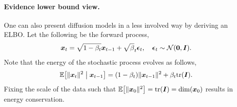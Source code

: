 \paragraph{Evidence lower bound view.}

One can also present diffusion models in a less involved way by deriving an ELBO. Let the following be the forward process, \[
    \bm{x}_t = \sqrt{1-\beta_t} \bm{x}_{t-1} + \sqrt{\beta}_t \bm{\epsilon}_t, \quad \bm{\epsilon}_t \sim \mathcal{N}(\bm{0}, \bm{I}).
\]
Note that the energy of the stochastic process evolves as follows, \[
    \E \lft[ \| \vec{x}_t \|^2 \;\middle|\; \vec{x}_{t-1} \rgt] = (1-\beta_t) \| \vec{x}_{t-1} \|^2 + \beta_t \tr{\mat{I}}.
\]
Fixing the scale of the data such that $\E \lft[ \| \vec{x}_0 \|^2 \rgt] = \tr{\mat{I}} =
\mathrm{dim}(\vec{x}_0)$ results in energy conservation.

